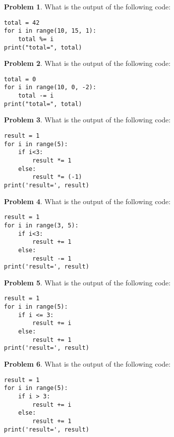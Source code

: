 \documentclass[10pt]{article}
\theoremstyle{definition}
\newtheorem{problem}{Problem}
\begin{document}
\begin{problem}
    What is the output of the following code:
\end{problem}
\begin{lstlisting}
total = 42
for i in range(10, 15, 1):
    total %= i
print("total=", total)
\end{lstlisting}
\vspace{2in}

\begin{problem}
    What is the output of the following code:
\end{problem}
\begin{lstlisting}
total = 0
for i in range(10, 0, -2):
    total -= i
print("total=", total)
\end{lstlisting}
\vspace{2in}



\begin{problem}
    What is the output of the following code:
\end{problem}
\begin{lstlisting}
result = 1
for i in range(5):
    if i<3:
        result *= 1
    else:
        result *= (-1)
print('result=', result)
\end{lstlisting}
\vspace{2in}

\begin{problem}
    What is the output of the following code:
\end{problem}
\begin{lstlisting}
result = 1
for i in range(3, 5):
    if i<3:
        result += 1
    else:
        result -= 1
print('result=', result)
\end{lstlisting}
\vspace{2in}



\begin{problem}
    What is the output of the following code:
\end{problem}
\begin{lstlisting}
result = 1
for i in range(5):
    if i <= 3:
        result += i
    else:
        result += 1
print('result=', result)
\end{lstlisting}
\vspace{2in}

\begin{problem}
    What is the output of the following code:
\end{problem}
\begin{lstlisting}
result = 1
for i in range(5):
    if i > 3:
        result += i
    else:
        result += 1
print('result=', result)
\end{lstlisting}
\vspace{2in}
\end{document}
